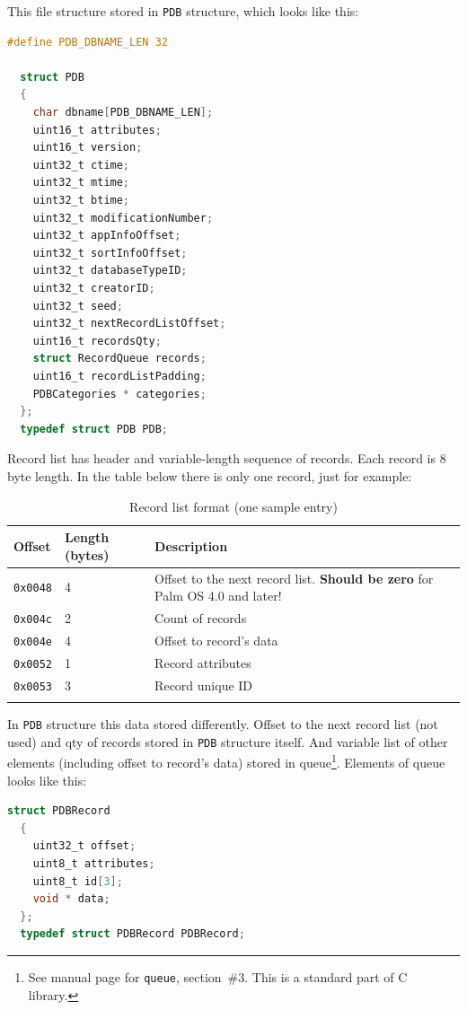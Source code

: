 \documentclass[a4paper,12pt,oneside]{scrartcl}
\begin{document}
This file structure stored in \texttt{PDB} structure, which looks like this:
\begin{lstlisting}[language=C, caption={C structure to store PDB file contents in
    memory}]
  #define PDB_DBNAME_LEN 32

  struct PDB
  {
	char dbname[PDB_DBNAME_LEN];
	uint16_t attributes;
	uint16_t version;
	uint32_t ctime;
	uint32_t mtime;
	uint32_t btime;
	uint32_t modificationNumber;
	uint32_t appInfoOffset;
	uint32_t sortInfoOffset;
	uint32_t databaseTypeID;
	uint32_t creatorID;
	uint32_t seed;
	uint32_t nextRecordListOffset;
	uint16_t recordsQty;
	struct RecordQueue records;
	uint16_t recordListPadding;
	PDBCategories * categories;
  };
  typedef struct PDB PDB;
\end{lstlisting}

Record list has header and variable-length sequence of records. Each record is 8
byte length. In the table below there is only one record, just for example:
\begin{longtable}{|p{2cm}|p{4cm}|p{7cm}|}
  \hline
  \textbf{Offset} & \textbf{Length (bytes)} & \textbf{Description} \\
  \hline
  \texttt{0x0048} & 4 & Offset to the next record list. \textbf{Should be zero} for Palm OS 4.0 and later! \\
  \hline
  \texttt{0x004c} & 2 & Count of records \\
  \hline
  \texttt{0x004e} & 4 & Offset to record's data \\
  \hline
  \texttt{0x0052} & 1 & Record attributes \\
  \hline
  \texttt{0x0053} & 3 & Record unique ID \\
  \hline
  \caption{Record list format (one sample entry)}
  \label{tab:record-list-format}
\end{longtable}

In \texttt{PDB} structure this data stored differently. Offset to the next
record list (not used) and qty of records stored in \texttt{PDB} structure
itself. And variable list of other elements (including offset to record's data)
stored in queue\footnote{See manual page for \texttt{queue}, section~\#3. This
  is a standard part of C library.}. Elements of queue looks like this:
\begin{lstlisting}[language=C, caption={C structure to store one element of
    record from PDB file}]
  struct PDBRecord
  {
	uint32_t offset;
	uint8_t attributes;
	uint8_t id[3];
	void * data;
  };
  typedef struct PDBRecord PDBRecord;
\end{lstlisting}
\end{document}
